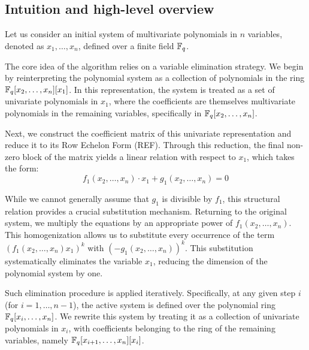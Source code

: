 

\subsection{Intuition and high-level overview}
Let us consider an initial system of multivariate polynomials in $n$ variables, denoted as $x_1, \dots, x_n$, defined over a finite field $\mathbb{F}_q$. 

The core idea of the algorithm relies on a variable elimination strategy. We begin by reinterpreting the polynomial system as a collection of polynomials in the ring $\mathbb{F}_q[x_2, \dots, x_n][x_1]$. In this representation, the system is treated as a set of univariate polynomials in $x_1$, where the coefficients are themselves multivariate polynomials in the remaining variables, specifically in $\mathbb{F}_q[x_2, \dots, x_n]$.

Next, we construct the coefficient matrix of this univariate representation and reduce it to its Row Echelon Form (REF). Through this reduction, the final non-zero block of the matrix yields a linear relation with respect to $x_1$, which takes the form:
\begin{equation*}
    f_1(x_2, \dots, x_n)\cdot x_1 + g_1(x_2, \dots, x_n) = 0
    \label{eq:linear_relation_1}
\end{equation*}

While we cannot generally assume that $g_1$ is divisible by $f_1$, this structural relation provides a crucial substitution mechanism. Returning to the original system, we multiply the equations by an appropriate power of $f_1(x_2, \dots, x_n)$. This homogenization allows us to substitute every occurrence of the term $(f_1(x_2, \dots, x_n)x_1)^k$ with $(-g_1(x_2, \dots, x_n))^k$. This substitution systematically eliminates the variable $x_1$, reducing the dimension of the polynomial system by one.

Such elimination procedure is applied iteratively. Specifically, at any given step $i$ (for $i = 1, \dots, n-1$), the active system is defined over the polynomial ring $\mathbb{F}_q[x_i, \dots, x_n]$. We rewrite this system by treating it as a collection of univariate polynomials in $x_i$, with coefficients belonging to the ring of the remaining variables, namely $\mathbb{F}_q[x_{i+1}, \dots, x_n][x_i]$. 


